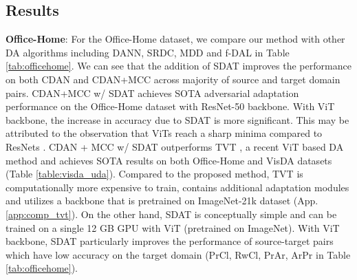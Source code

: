 \documentclass[table,dvipsnames]{article}
\theoremstyle{plain}
\theoremstyle{definition}
\theoremstyle{remark}
\begin{document}
\subsection{Results}




\textbf{Office-Home}: For the Office-Home dataset, we compare our method with other DA algorithms including DANN, SRDC, MDD and f-DAL in Table \ref{tab:officehome}.
We can see that the addition of SDAT improves the performance on both CDAN and CDAN+MCC across majority of source and target domain pairs. CDAN+MCC w/ SDAT achieves SOTA adversarial adaptation performance on the Office-Home dataset with ResNet-50 backbone. With ViT backbone, the increase in accuracy due to SDAT is more significant. This may be attributed to the observation that ViTs reach a sharp minima compared to ResNets \cite{chen2021vision}. CDAN + MCC w/ SDAT outperforms TVT \cite{yang2021tvt}, a recent ViT based DA method and achieves SOTA results on both Office-Home and VisDA datasets (Table \ref{table:visda_uda}). Compared to the proposed method, TVT is computationally more expensive to train, contains additional adaptation modules and utilizes a backbone that is pretrained on ImageNet-21k dataset (App. \ref{app:comp_tvt}). On the other hand, SDAT is conceptually simple and can be trained on a single 12 GB GPU with ViT (pretrained on ImageNet). 
With ViT backbone, SDAT particularly improves the performance of source-target pairs which have low accuracy on the target domain (PrCl, RwCl, PrAr, ArPr in Table \ref{tab:officehome}). 
\end{document}
